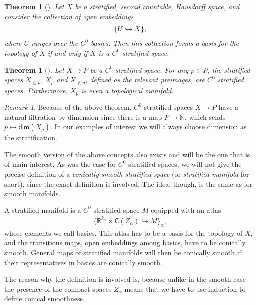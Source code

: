 \documentclass[12pt,a4paper]{article}
\newcounter{counter} \numberwithin{counter}{section}
\theoremstyle{definition}
\theoremstyle{plain}
\newtheorem{theorem}[counter]{Theorem}
\theoremstyle{remark}
\newtheorem{remark}[counter]{Remark}
\begin{document}
\begin{theorem}[{\cite[lem.2.2.2]{aft_localstrut}}]\label{thm:basics_give_basis}
    Let $X$ be a stratified, second countable, Hausdorff space, and consider the collection of open embeddings
    \begin{align}
        \{ U \xhookrightarrow{} X\},
    \end{align}
    where $U$ ranges over the $C^0$ basics. Then this collection forms a basis for the topology of $X$ if and only if $X$ is a $C^0$ stratified space.
\end{theorem}

\begin{theorem}[{\cite[cor.2.3.5]{aft_localstrut}}]
    Let $X \rightarrow P$ be a $C^0$ stratified space. For any $p \in P$, the stratified spaces $X_{\leq p}$, $X_{p}$ and $X_{\nless p}$, defined as the relevant preimages, are $C^0$ stratified spaces. Furthermore, $X_p$ is even a topological manifold.
\end{theorem}

\begin{remark}
    Because of the above theorem, $C^0$ stratified spaces $X \rightarrow P$ have a natural filtration by dimension since there is a map $P \rightarrow \mathbb{N}$, which sends $p \mapsto \mathsf{dim}(X_p)$. In our examples of interest we will always choose dimension as the stratification.
\end{remark}


The smooth version of the above concepts also exists and will be the one that is of main interest. As was the case for $C^0$ stratified spaces, we will not give the precise definition of a \emph{conically smooth stratified space} (or \emph{stratified manifold} for short), since the exact definition is involved. The idea, though, is the same as for smooth manifolds.

A stratified manifold is a $C^0$ stratified space $M$ equipped with an atlas
%
\begin{align}
    \{\mathbb{R}^{k_\alpha} \times \mathsf{C}(Z_\alpha) \hookrightarrow M\}_\alpha,
\end{align}
%
whose elements we call basics. This atlas has to be a basis for the topology of $X$, and the transitions maps, open embeddings among basics, have to be conically smooth. General maps of stratified manifolds will then be conically smooth if their representatives in basics are conically smooth.

The reason why the definition is involved is, because unlike in the smooth case the presence of the compact spaces $Z_\alpha$ means that we have to use induction to define conical smoothness.
\end{document}
